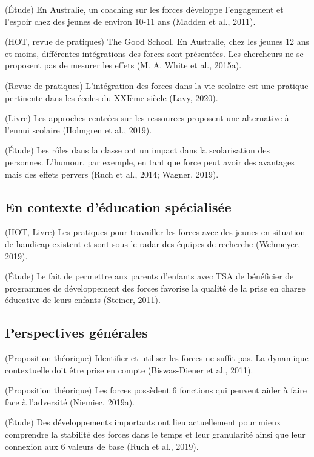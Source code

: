 \documentclass[
  french,
]{article}
\begin{document}
(Étude) En Australie, un coaching sur les forces développe l'engagement et l'espoir chez des jeunes de environ 10-11 ans (Madden et al., 2011).

(HOT, revue de pratiques) The Good School. En Australie, chez les jeunes 12 ans et moins, différentes intégrations des forces sont présentées. Les chercheurs ne se proposent pas de mesurer les effets (M. A. White et al., 2015a).

(Revue de pratiques) L'intégration des forces dans la vie scolaire est une pratique pertinente dans les écoles du XXIème siècle (Lavy, 2020).

(Livre) Les approches centrées sur les ressources proposent une alternative à l'ennui scolaire (Holmgren et al., 2019).

(Étude) Les rôles dans la classe ont un impact dans la scolarisation des personnes. L'humour, par exemple, en tant que force peut avoir des avantages mais des effets pervers (Ruch et al., 2014; Wagner, 2019).

\hypertarget{en-contexte-duxe9ducation-spuxe9cialisuxe9e}{%
\subsection{En contexte d'éducation spécialisée}\label{en-contexte-duxe9ducation-spuxe9cialisuxe9e}}

(HOT, Livre) Les pratiques pour travailler les forces avec des jeunes en situation de handicap existent et sont sous le radar des équipes de recherche (Wehmeyer, 2019).

(Étude) Le fait de permettre aux parents d'enfants avec TSA de bénéficier de programmes de développement des forces favorise la qualité de la prise en charge éducative de leurs enfants (Steiner, 2011).

\hypertarget{perspectives-guxe9nuxe9rales}{%
\subsection{Perspectives générales}\label{perspectives-guxe9nuxe9rales}}

(Proposition théorique) Identifier et utiliser les forces ne suffit pas. La dynamique contextuelle doit être prise en compte (Biswas-Diener et al., 2011).

(Proposition théorique) Les forces possèdent 6 fonctions qui peuvent aider à faire face à l'adversité (Niemiec, 2019a).

(Étude) Des développements importants ont lieu actuellement pour mieux comprendre la stabilité des forces dans le temps et leur granularité ainsi que leur connexion aux 6 valeurs de base (Ruch et al., 2019).
\end{document}
